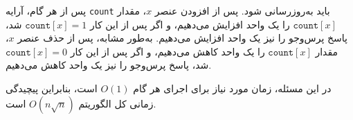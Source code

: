 پس از هر گام، آرایه \texttt{count}
باید به‌روزرسانی شود.
پس از افزودن عنصر $x$،
مقدار $\texttt{count}[x]$ را یک واحد افزایش می‌دهیم،
و اگر پس از این کار $\texttt{count}[x]=1$ شد،
پاسخ پرس‌وجو را نیز یک واحد افزایش می‌دهیم.
به‌طور مشابه، پس از حذف عنصر $x$،
مقدار $\texttt{count}[x]$ را یک واحد کاهش می‌دهیم،
و اگر پس از این کار $\texttt{count}[x]=0$ شد،
پاسخ پرس‌وجو را نیز یک واحد کاهش می‌دهیم.

در این مسئله، زمان مورد نیاز برای اجرای
هر گام $O(1)$ است، بنابراین پیچیدگی زمانی کل
الگوریتم $O(n \sqrt n)$ است.
